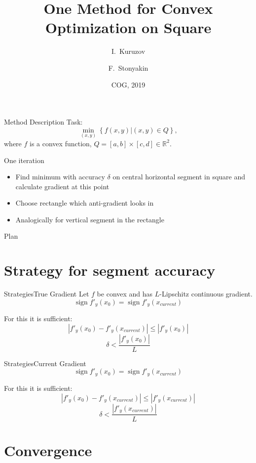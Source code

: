 \documentclass{beamer}
\title{One Method for Convex Optimization on Square}
\author{I.~Kuruzov\inst{1} \and F.~Stonyakin\inst{1, 2}}
\institute[MIPT] %
{
  \inst{1}%
Moscow Institute of Physics and Technology
  \and
  \inst{2}%
V.I.Vernadsky Crimean Federal University}
\date{COG, 2019}
\DeclareMathOperator{\sign}{sign}
\begin{document}
\begin{frame}
  \titlepage
\end{frame}


\begin{frame}{Method Description}
Task:
$$\min_{(x,y)}\left\{f(x,y)|(x,y) \in Q\right\},$$
where $f$ is a convex function, $Q = [a,b]\times[c, d]\in \mathbb{R}^2$.

\begin{block}{One iteration}
\begin{itemize}
\item{Find minimum with accuracy $\delta$ on central horizontal segment in square and calculate gradient at this point\pause}
\item{Choose rectangle which anti-gradient looks in\pause}
\item{Analogically for vertical segment in the rectangle}
\end{itemize}
\end{block}
\end{frame}

\begin{frame}{Plan}
  \tableofcontents
\end{frame}


\section{Strategy for segment accuracy}


\begin{frame}{Strategies}{True Gradient}
Let $f$ be convex and has $L$-Lipschitz continuous gradient.
    $$\sign f'_y(x_0) = \sign f'_y(x_{current})$$
    
For this it is sufficient:
    $$|f'_y(x_0) - f'_y(x_{current})| \leq |f'_y(x_0)|$$
	\pause
  $$\boxed{\delta < \frac{|f'_y(x_{0})|}{L}}$$
\end{frame}

\begin{frame}{Strategies}{Current Gradient}
    $$\sign f'_y(x_0) = \sign f'_y(x_{current})$$
    
For this it is sufficient:
    $$|f'_y(x_0) - f'_y(x_{current})| \leq |f'_y(x_{current})|$$
	\pause
  $$\boxed{\delta < \frac{|f'_y(x_{current})|}{L}}$$
\end{frame}

\section{Convergence}
\end{document}
